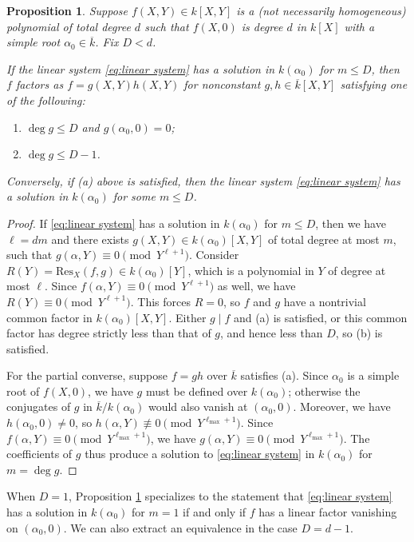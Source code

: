 \documentclass{amsart}
\newcommand{\lmax}{\ell_{\max}}
\newtheorem{proposition}[theorem]{Proposition}
\theoremstyle{definition}
\numberwithin{equation}{section}
\numberwithin{table}{section}
\begin{document}
\begin{proposition}
\label{prop:linear_systems}
    Suppose $f(X,Y) \in k[X,Y]$ is a (not necessarily homogeneous) polynomial of total degree $d$ such that $f(X,0)$ is degree $d$ in $k[X]$ with a simple root $\alpha_0 \in \overline{k}$. Fix $D < d$.
    
    If the linear system \eqref{eq:linear system} has a solution in $k(\alpha_0)$ for $m \leq D$, then $f$ factors as $f = g(X,Y)h(X,Y)$ for nonconstant $g,h \in \overline{k}[X,Y]$ satisfying one of the following:
    \begin{enumerate}[label = (\alph*)]
    	\item $\deg g \leq D$ and $g(\alpha_0,0) = 0$;
    	\item $\deg g \leq D-1$.
    \end{enumerate}
    Conversely, if (a) above is satisfied, then the linear system \eqref{eq:linear system} has a solution in $k(\alpha_0)$ for some $m \leq D$.
\end{proposition}

\begin{proof}
    If \eqref{eq:linear system} has a solution in $k(\alpha_0)$ for $m \leq D$, then we have $\ell = dm$ and there exists $g(X,Y) \in k(\alpha_0)[X,Y]$ of total degree at most $m$, such that $g(\alpha,Y) \equiv 0 \pmod{Y^{\ell+1}}$. Consider $R(Y) = \mathrm{Res}_X(f,g) \in k(\alpha_0)[Y]$, which is a polynomial in $Y$ of degree at most $\ell$. Since $f(\alpha,Y) \equiv 0 \pmod{Y^{\ell+1}}$ as well, we have $R(Y) \equiv 0 \pmod{Y^{\ell+1}}$. This forces $R=0$, so $f$ and $g$ have a nontrivial common factor in $k(\alpha_0)[X,Y]$. Either $g\mid f$ and (a) is satisfied, or this common factor has degree strictly less than that of $g$, and hence less than $D$, so (b) is satisfied.
    
    For the partial converse, suppose $f = gh$ over $\overline{k}$ satisfies (a). Since $\alpha_0$ is a simple root of $f(X,0)$, we have $g$ must be defined over $k(\alpha_0)$; otherwise the conjugates of $g$ in $\overline{k}/k(\alpha_0)$ would also vanish at $(\alpha_0,0)$. Moreover, we have $h(\alpha_0,0) \neq 0$, so $h(\alpha,Y) \not\equiv 0 \pmod{Y^{\lmax+1}}$. Since $f(\alpha,Y) \equiv 0 \pmod{Y^{\lmax+1}}$, we have $g(\alpha,Y) \equiv 0 \pmod{Y^{\lmax+1}}$. The coefficients of $g$ thus produce a solution to \eqref{eq:linear system} in $k(\alpha_0)$ for $m = \deg g$.
\end{proof}

When $D=1$, Proposition \ref{prop:linear_systems} specializes to the statement that \eqref{eq:linear system} has a solution in $k(\alpha_0)$ for $m=1$ if and only if $f$ has a linear factor vanishing on $(\alpha_0,0)$. We can also extract an equivalence in the case $D= d-1$.
\end{document}
